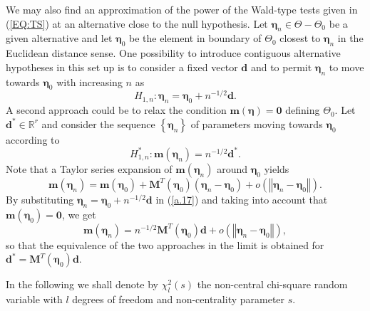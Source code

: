\documentclass[a4paper]{article}%
\begin{document}
We may also find an approximation of the power of the Wald-type tests given in (\ref{EQ:TS}) at an alternative close to the null
hypothesis. Let $\boldsymbol{\eta}_{n}\in\Theta-\Theta_{0}$ be a given
alternative and let $\boldsymbol{\eta}_{0}$ be the element in boundary of $\Theta_{0}$
closest to $\boldsymbol{\eta}_{n}$ in the Euclidean distance sense. One
possibility to introduce contiguous alternative hypotheses in this set up  is to consider a
fixed vector $\boldsymbol{d}$ and to permit $\boldsymbol{\eta}_{n}$
to move towards $\boldsymbol{\eta}_{0}$ with increasing $n$ as 
\begin{equation}
H_{1,n}:\boldsymbol{\eta}_{n}=\boldsymbol{\eta}_{0}+n^{-1/2}\boldsymbol{d}.
\label{a.15}%
\end{equation}
A second approach could be to relax the condition $\boldsymbol{m}\left(
\boldsymbol{\eta}\right)  =\boldsymbol{0}$ defining $\Theta_{0}.$ Let
$\boldsymbol{d}^{\ast}\in\mathbb{R}^{r}$ and consider the  sequence
$\left\{  \boldsymbol{\eta}_{n}\right\}  $ of parameters moving towards
$\boldsymbol{\eta}_{0}$ according to
\begin{equation}
H_{1,n}^{\ast}:\boldsymbol{m}\left(  \boldsymbol{\eta}_{n}\right)
=n^{-1/2}\boldsymbol{d}^{\ast}. \label{a.16}%
\end{equation}
Note that a Taylor series expansion of $\boldsymbol{m}\left(  \boldsymbol{\eta
}_{n}\right)  $ around $\boldsymbol{\eta}_{0}$ yields
\begin{equation}
\boldsymbol{m}\left(  \boldsymbol{\eta}_{n}\right)  =\boldsymbol{m}%
(\boldsymbol{\eta}_{0})+\boldsymbol{M}^{T}(\boldsymbol{\eta}_{0})\left(
\boldsymbol{\eta}_{n}-\boldsymbol{\eta}_{0}\right)  +o\left(  \left\Vert
\boldsymbol{\eta}_{n}-\boldsymbol{\eta}_{0}\right\Vert \right)  . \label{a.17}%
\end{equation}
By substituting $\boldsymbol{\eta}_{n}=\boldsymbol{\eta}_{0}+n^{-1/2}%
\boldsymbol{d}$ in (\ref{a.17}) and taking into account that\textbf{\ }%
$\boldsymbol{m}(\boldsymbol{\eta}_{0})=\boldsymbol{0}$, we get
\[
\boldsymbol{m}\left(  \boldsymbol{\eta}_{n}\right)  =n^{-1/2}\boldsymbol{M}%
^{T}(\boldsymbol{\eta}_{0})\boldsymbol{d}+o\left(  \left\Vert \boldsymbol{\eta
}_{n}-\boldsymbol{\eta}_{0}\right\Vert \right)  ,
\]
so that the equivalence of the two approaches  in the limit is obtained for $\boldsymbol{d}^{\ast
}\boldsymbol{=M}^{T}(\boldsymbol{\eta}_{0})\boldsymbol{d}$.

In the following we shall denote by $\chi_{l}^{2}(s)$ the non-central
chi-square random variable with $l$ degrees of freedom and non-centrality
parameter $s$.
\end{document}
